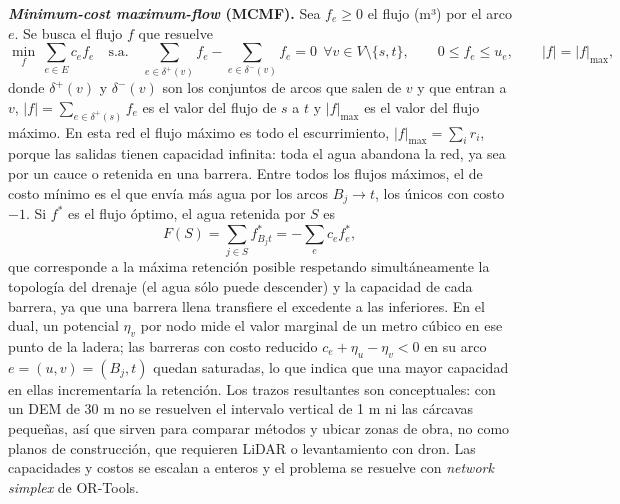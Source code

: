 \documentclass[11pt,letterpaper]{article}
\begin{document}
\textbf{\emph{Minimum-cost maximum-flow} (MCMF).} Sea $f_e\ge0$ el flujo (m³) por el arco $e$. Se busca el flujo $f$ que resuelve
\begin{equation}
\min_{f}\ \sum_{e\in E} c_e f_e \quad\text{s.a.}\quad \sum_{e\in\delta^+(v)} f_e-\sum_{e\in\delta^-(v)} f_e = 0\ \ \forall v\in V\setminus\{s,t\},\qquad 0\le f_e\le u_e,\qquad |f| = |f|_{\max},
\end{equation}
donde $\delta^{+}(v)$ y $\delta^{-}(v)$ son los conjuntos de arcos que salen de $v$ y que entran a $v$, $|f|=\sum_{e\in\delta^+(s)}f_e$ es el valor del flujo de $s$ a $t$ y $|f|_{\max}$ es el valor del flujo máximo. En esta red el flujo máximo es todo el escurrimiento, $|f|_{\max}=\sum_i r_i$, porque las salidas tienen capacidad infinita: toda el agua abandona la red, ya sea por un cauce o retenida en una barrera. Entre todos los flujos máximos, el de costo mínimo es el que envía más agua por los arcos $B_j\to t$, los únicos con costo $-1$. Si $f^\ast$ es el flujo óptimo, el agua retenida por $S$ es
\begin{equation}
F(S)=\sum_{j\in S} f^\ast_{B_j t}=-\sum_e c_e f^\ast_e ,
\end{equation}
que corresponde a la máxima retención posible respetando simultáneamente la topología del drenaje (el agua sólo puede descender) y la capacidad de cada barrera, ya que una barrera llena transfiere el excedente a las inferiores. En el dual, un potencial $\eta_v$ por nodo mide el valor marginal de un metro cúbico en ese punto de la ladera; las barreras con costo reducido $c_e+\eta_u-\eta_v<0$ en su arco $e=(u,v)=(B_j,t)$ quedan saturadas, lo que indica que una mayor capacidad en ellas incrementaría la retención. Los trazos resultantes son conceptuales: con un DEM de 30 m no se resuelven el intervalo vertical de 1 m ni las cárcavas pequeñas, así que sirven para comparar métodos y ubicar zonas de obra, no como planos de construcción, que requieren LiDAR o levantamiento con dron. Las capacidades y costos se escalan a enteros y el problema se resuelve con \emph{network simplex} de OR-Tools.
\end{document}
